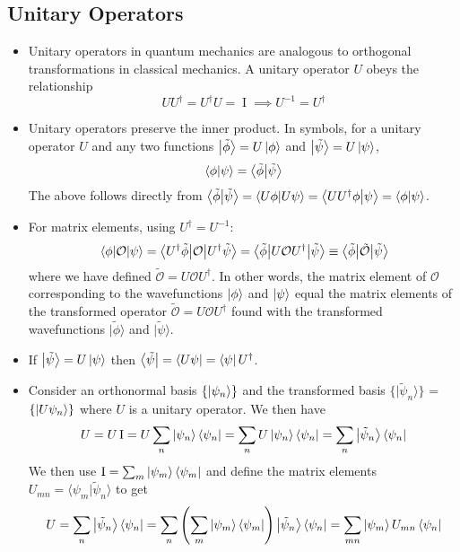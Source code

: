 \documentclass[11pt, a4paper]{article}
\renewcommand{\t}[1]{\tilde{#1}}
\renewcommand{\O}{\mathcal{O}}  %
\newcommand{\II}{\operatorname{I}}  %
\newcommand{\p}{\psi}  %
\newcommand{\bket}[1]{\big | {#1} \big \rangle }
\newcommand{\bbra}[1]{ \big \langle {#1} \big |  }
\newcommand{\bbraket}[2]{\big \langle {#1} \big | {#2} \big \rangle}  %
\newcommand{\bmel}[3]{\big \langle {#1} \big | {#2} \big | {#3} \big \rangle}  %
\begin{document}
\subsection{Unitary Operators}
\begin{itemize}
	\item Unitary operators in quantum mechanics are analogous to orthogonal transformations in classical mechanics. A unitary operator $ U $ obeys the relationship
	\begin{equation*}
		UU^{\dagger} = U^{\dagger}U = \II \implies U^{-1} = U^{\dagger}
	\end{equation*}
	
	\item Unitary operators preserve the inner product. In symbols, for a unitary operator $ U $ and any two functions $ \bket{\t{\phi}} = U\ket{\phi} $ and $ \bket{\t{\p}} = U \ket{\p} $, 
	\begin{equation*}
		\braket{\phi}{\p} = \bbraket{\t{\phi}}{\t{\p}}
	\end{equation*}
	The above follows directly from $  \bbraket{\t{\phi}}{\t{\p}} = \braket{U\phi}{U\p} = \braket{UU^{\dagger}\phi}{\p} = \braket{\phi}{\p} $.
	
	\item For matrix elements, using $ U^{\dagger} = U^{-1} $:
	\begin{equation*}
		\mel{\phi}{\O}{\p} = \bmel{U^{\dagger}\t{\phi}}{\O}{U^{\dagger}\t{\p}} =  \bmel{\t{\phi}}{U\O U^{\dagger}}{\t{\p}} \equiv  \bmel{\t{\phi}}{\t{\O}}{\t{\p}} 
	\end{equation*}
	where we have defined $ \t{\O} = U \O U^{\dagger} $. In other words, the matrix element of $ \O $ corresponding to the wavefunctions $ \ket{\phi} $ and $ \ket{\p} $ equal the matrix elements of the transformed operator $ \t{\O} = U \O U^{\dagger}  $ found with the transformed wavefunctions $  \bket{\t{\phi}} $ and $ \bket{\t{\p}} $.
	
	\item If $ \bket{\t{\p}} = U \ket{\p}$ then $ \bbra{\t{\p}} = \bra{U \p} = \bra{\p}U^{\dagger} $.
	
	\item Consider an orthonormal basis $ \{\ket{\p_{n}}\} $ and the transformed basis $ \{\bket{\t{\p}_{n}}\} $ = $ \{\ket{U\p_{n}}\} $ where $ U $ is a unitary operator. We then have
	\begin{equation*}
		U = U\II = U \sum_{n}\ket{\p_{n}}\bra{\p_{n}} = \sum_{n}U\ket{\p_{n}}\bra{\p_{n}} =  \sum_{n}\bket{\t{\p}_{n}}\bra{\p_{n}}
	\end{equation*}
	We then use $ \II = \sum_{m}\ket{\p_{m}}\bra{\p_{m}} $ and define the matrix elements $ U_{mn} = \bbraket{\p_{m}}{\t{\p}_{n}} $ to get
	\begin{equation*}
		U =  \sum_{n}\bket{\t{\p}_{n}}\bra{\p_{n}} = \sum_{n}\left(\sum_{m}\ket{\p_{m}}\bra{\p_{m}}\right)\bket{\t{\p}_{n}}\bra{\p_{n}} = \sum_{mn}\ket{\p_{m}}U_{mn}\bra{\p_{n}}
	\end{equation*}
	

\end{itemize}
\end{document}
